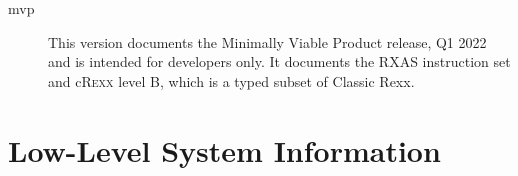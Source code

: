 \documentclass[english,11pt,twoside,toc=bib,toc=idx]{scrreprt}
\newcommand{\ARCH}{z/\kern-1pt Ar\-chi\-tec\-ture}
\newcommand{\ARCHarch}{\ARCH}
\newcommand{\theARCH}{the \ARCH}
\newcommand{\ARCH}{ESA/390}
\newcommand{\ARCHarch}{the \ARCH{} ar\-chi\-tec\-ture}
\newcommand{\theARCH}{\ARCHarch}
\newcommand{\crexx}{c\textsc{Rexx}}
\begin{document}
\begin{description}
\item[mvp] This version documents the Minimally Viable Product
  release, Q1 2022 and is intended for developers only. It documents
  the RXAS instruction set and \crexx{} level B, which is a typed
  subset of Classic Rexx.
\end{description}

\chapter{Low-Level System Information}






\end{document}
